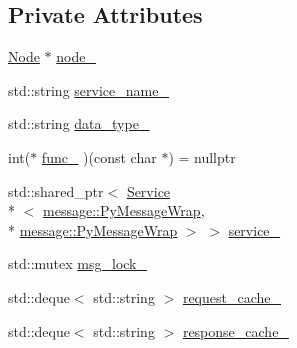 \subsection*{Private Attributes}
\begin{DoxyCompactItemize}
\item 
\hyperlink{classapollo_1_1cyber_1_1Node}{Node} $\ast$ \hyperlink{classapollo_1_1cyber_1_1PyService_a07c8fc13734dc16f9e904bc968e8b625}{node\-\_\-}
\item 
std\-::string \hyperlink{classapollo_1_1cyber_1_1PyService_a18608cb4dd8e78999a545a50ba031ebf}{service\-\_\-name\-\_\-}
\item 
std\-::string \hyperlink{classapollo_1_1cyber_1_1PyService_a513217bf46b0b77682301c3455cfe4b2}{data\-\_\-type\-\_\-}
\item 
int($\ast$ \hyperlink{classapollo_1_1cyber_1_1PyService_a2d5b481af42ce71251792b280b489fd6}{func\-\_\-} )(const char $\ast$) = nullptr
\item 
std\-::shared\-\_\-ptr$<$ \hyperlink{classapollo_1_1cyber_1_1Service}{Service}\\*
$<$ \hyperlink{classapollo_1_1cyber_1_1message_1_1PyMessageWrap}{message\-::\-Py\-Message\-Wrap}, \\*
\hyperlink{classapollo_1_1cyber_1_1message_1_1PyMessageWrap}{message\-::\-Py\-Message\-Wrap} $>$ $>$ \hyperlink{classapollo_1_1cyber_1_1PyService_a99aaf93ea49699319a639b7e4d5bcb47}{service\-\_\-}
\item 
std\-::mutex \hyperlink{classapollo_1_1cyber_1_1PyService_a072867c4addabd216a1570ef47fa32b9}{msg\-\_\-lock\-\_\-}
\item 
std\-::deque$<$ std\-::string $>$ \hyperlink{classapollo_1_1cyber_1_1PyService_ae4e009d900897119b74006f69c9218ba}{request\-\_\-cache\-\_\-}
\item 
std\-::deque$<$ std\-::string $>$ \hyperlink{classapollo_1_1cyber_1_1PyService_aaca305c91e61517f7e86ad84372091fd}{response\-\_\-cache\-\_\-}
\end{DoxyCompactItemize}



